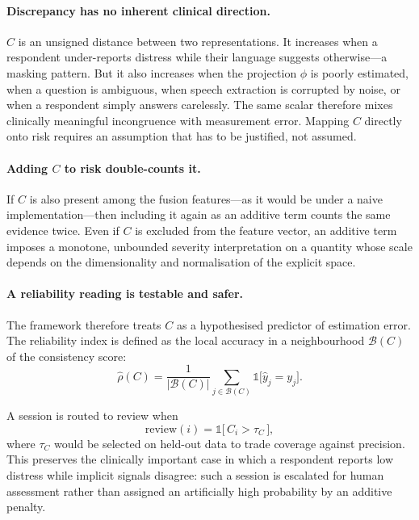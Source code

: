 \documentclass[12pt]{article}
\begin{document}
\paragraph{Discrepancy has no inherent clinical direction.} $C$ is an
unsigned distance between two representations. It increases when a
respondent under-reports distress while their language suggests
otherwise---a masking pattern. But it also increases when the
projection $\phi$ is poorly estimated, when a question is ambiguous,
when speech extraction is corrupted by noise, or when a respondent
simply answers carelessly. The same scalar therefore mixes clinically
meaningful incongruence with measurement error. Mapping $C$ directly
onto risk requires an assumption that has to be justified, not assumed.

\paragraph{Adding $C$ to risk double-counts it.} If $C$ is also present
among the fusion features---as it would be under a naive
implementation---then including it again as an additive term counts the
same evidence twice. Even if $C$ is excluded from the feature vector,
an additive term imposes a monotone, unbounded severity interpretation
on a quantity whose scale depends on the dimensionality and
normalisation of the explicit space.

\paragraph{A reliability reading is testable and safer.} The framework
therefore treats $C$ as a hypothesised predictor of estimation error.
The reliability index is defined as the local accuracy in a
neighbourhood $\mathcal{B}(C)$ of the consistency score:
\begin{equation}
\hat{\rho}(C)
= \frac{1}{|\mathcal{B}(C)|}
  \sum_{j\in\mathcal{B}(C)} \mathbb{1}\bigl[\hat{y}_j = y_j\bigr] .
\end{equation}

\noindent A session is routed to review when
\begin{equation}
\text{review}(i) = \mathbb{1}\bigl[\,C_i > \tau_{C}\,\bigr],
\label{eq:gate}
\end{equation}
where $\tau_C$ would be selected on held-out data to trade coverage
against precision. This preserves the clinically important case in which
a respondent reports low distress while implicit signals disagree: such
a session is escalated for human assessment rather than assigned an
artificially high probability by an additive penalty.
\end{document}
